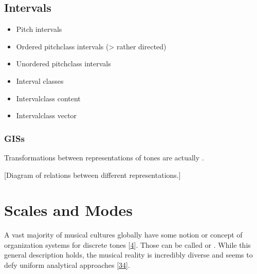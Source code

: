 \documentclass[letterpaper,10pt,english]{sphinxmanual}
\begin{document}
\section{Intervals}
\label{\detokenize{1_fundamentals:intervals}}\label{\detokenize{1_fundamentals:id6}}\begin{itemize}
\item {} 
\sphinxAtStartPar
Pitch intervals

\item {} 
\sphinxAtStartPar
Ordered pitch\sphinxhyphen{}class intervals (\sphinxhyphen{}\textgreater{} rather directed)

\item {} 
\sphinxAtStartPar
Unordered pitch\sphinxhyphen{}class intervals

\item {} 
\sphinxAtStartPar
Interval classes

\item {} 
\sphinxAtStartPar
Interval\sphinxhyphen{}class content

\item {} 
\sphinxAtStartPar
Interval\sphinxhyphen{}class vector

\end{itemize}


\subsection{GISs}
\label{\detokenize{1_fundamentals:giss}}\label{\detokenize{1_fundamentals:sec-gis}}
\sphinxAtStartPar
Transformations between representations of tones are actually .

\sphinxAtStartPar
{[}Diagram of relations between different representations.{]}


\chapter{Scales and Modes}
\label{\detokenize{2_scales_modes:scales-and-modes}}\label{\detokenize{2_scales_modes::doc}}
\sphinxAtStartPar
A vast majority of musical cultures globally have some notion or concept of organization systems
for discrete tones {[}\hyperlink{cite.8_bibliography:id49}{4}{]}. Those can be called  or .
While this general description holds, the musical reality is incredibly diverse and seems to defy
uniform analytical approaches {[}\hyperlink{cite.8_bibliography:id50}{34}{]}.
\end{document}
